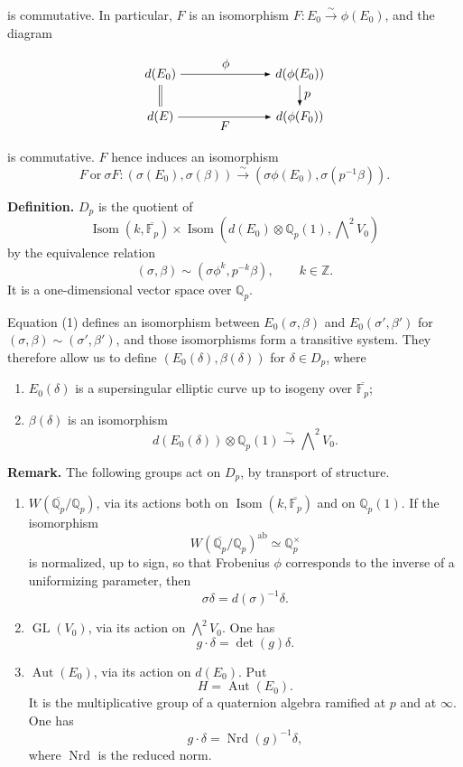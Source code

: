 \documentclass[11pt]{article}
\newcommand{\Z}{\mathbb{Z}}
\newcommand{\Fp}{\mathbb{F}_{p}}
\newcommand{\Qp}{\mathbb{Q}_{p}}
\newcommand{\Isom}{\operatorname{Isom}}
\newcommand{\Aut}{\operatorname{Aut}}
\newcommand{\GL}{\operatorname{GL}}
\newcommand{\Nrd}{\operatorname{Nrd}}
\begin{document}
is commutative. In particular, \(F\) is an isomorphism \(F:E_0\xrightarrow{\sim}\phi(E_0)\), and the diagram

\[
\begin{tikzpicture}[x=1.05cm,y=0.85cm,>=Latex,baseline=(current bounding box.center)]
  \node (a) at (0,1.4) {$d(E_0)$};
  \node (b) at (3.7,1.4) {$d(\phi(E_0))$};
  \node (c) at (0,0) {$d(E)$};
  \node (d) at (3.7,0) {$d(\phi(F_0))$};
  \draw[->] (a) -- node[above] {$\phi$} (b);
  \draw[double distance=1.5pt] (a) -- (c);
  \draw[->] (b) -- node[right] {$p$} (d);
  \draw[->] (c) -- node[below] {$F$} (d);
\end{tikzpicture}
\]

is commutative. \(F\) hence induces an isomorphism
\[
\tag{1}
F\ \text{or}\ \sigma F:(\sigma(E_0),\sigma(\beta))
\xrightarrow{\sim}
(\sigma\phi(E_0),\sigma(p^{-1}\beta)).
\]

\textbf{Definition.} \(D_p\) is the quotient of
\[
\Isom(k,\overline{\Fp})\times
\Isom\!\left(d(E_0)\otimes\Qp(1),\bigwedge\nolimits^2V_0\right)
\]
by the equivalence relation
\[
(\sigma,\beta)\sim(\sigma\phi^k,p^{-k}\beta),\qquad k\in\Z .
\]
It is a one-dimensional vector space over \(\Qp\).

Equation (1) defines an isomorphism between \(E_0(\sigma,\beta)\) and \(E_0(\sigma',\beta')\) for \((\sigma,\beta)\sim(\sigma',\beta')\), and those isomorphisms form a transitive system. They therefore allow us to define \((E_0(\delta),\beta(\delta))\) for \(\delta\in D_p\), where
\begin{enumerate}[label=(\alph*)]
\item \(E_0(\delta)\) is a supersingular elliptic curve up to isogeny over \(\overline{\Fp}\);
\item \(\beta(\delta)\) is an isomorphism
\[
d(E_0(\delta))\otimes\Qp(1)\xrightarrow{\sim}\bigwedge\nolimits^2V_0 .
\]
\end{enumerate}

\textbf{Remark.} The following groups act on \(D_p\), by transport of structure.
\begin{enumerate}[label=(\alph*)]
\item \(W(\overline{\Qp}/\Qp)\), via its actions both on \(\Isom(k,\overline{\Fp})\) and on \(\Qp(1)\). If the isomorphism
\[
W(\overline{\Qp}/\Qp)^{\mathrm{ab}}\simeq\Qp^\times
\]
is normalized, up to sign, so that Frobenius \(\phi\) corresponds to the inverse of a uniformizing parameter, then
\[
\sigma\delta=d(\sigma)^{-1}\delta .
\]
\item \(\GL(V_0)\), via its action on \(\bigwedge^2V_0\). One has
\[
g\cdot\delta=\det(g)\delta .
\]
\item \(\Aut(E_0)\), via its action on \(d(E_0)\). Put
\[
H=\Aut(E_0).
\]
It is the multiplicative group of a quaternion algebra ramified at \(p\) and at \(\infty\). One has
\[
g\cdot\delta=\Nrd(g)^{-1}\delta ,
\]
where \(\Nrd\) is the reduced norm.
\end{enumerate}
\end{document}
